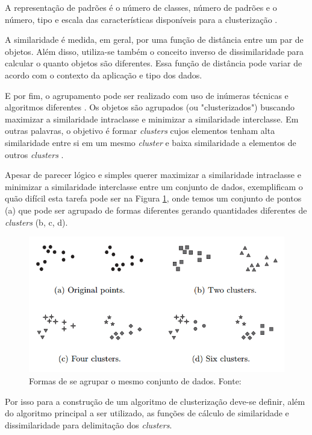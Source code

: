 A representação de padrões é o número de classes, número de padrões e o número, tipo e escala
das características disponíveis para a clusterização \cite{clustering_review}.

A similaridade é medida, em geral, por uma função de distância entre um par de objetos. Além disso, utiliza-se também
o conceito inverso de dissimilaridade para calcular o quanto objetos são diferentes. Essa função de distância pode variar de acordo 
com o contexto da aplicação e tipo dos dados. 

E por fim, o agrupamento pode ser realizado com uso de inúmeras técnicas e algoritmos diferentes \cite{clustering_review}.
Os objetos são agrupados (ou "clusterizados") buscando maximizar a similaridade intraclasse e minimizar a similaridade interclasse.
Em outras palavras, o objetivo é formar \textit{clusters} cujos elementos tenham alta similaridade entre si em um mesmo \textit{cluster} 
e baixa similaridade a elementos de outros \textit{clusters} \cite{han2011data}.

Apesar de parecer lógico e simples querer maximizar a similaridade intraclasse e minimizar a similaridade interclasse entre um conjunto de dados, 
 exemplificam o quão difícil esta tarefa pode ser na Figura \ref{fig:clusters_difficulty}, onde temos um conjunto
de pontos (a) que pode ser agrupado de formas diferentes gerando quantidades diferentes de \textit{clusters} (b, c, d).

\begin{figure}[ht!]
\centering
\includegraphics[scale=0.4]{figuras/clusters_difficulty.png}
\caption{Formas de se agrupar o mesmo conjunto de dados. Fonte: \cite{tan2013data}}
\label{fig:clusters_difficulty}
\end{figure}

Por isso para a construção de um algoritmo de clusterização deve-se definir, além do algoritmo principal a ser utilizado, as funções
de cálculo de similaridade e dissimilaridade para delimitação dos \textit{clusters}.

